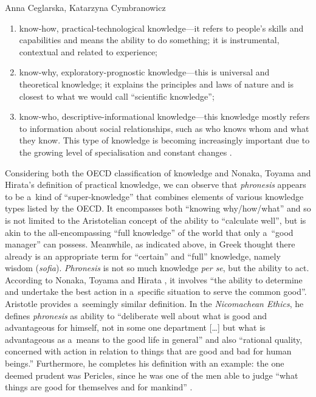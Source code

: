 \begin{artengenv2auth}{Anna Ceglarska, Katarzyna Cymbranowicz}
\begin{enumerate}
\item know-how, practical-technological knowledge---it refers to people's skills and capabilities and means the ability to do something; it is instrumental, contextual and related to experience;

\item know-why, exploratory-prognostic knowledge---this is universal and theoretical knowledge; it explains the principles and laws of nature and is closest to what we would call ``scientific knowledge'';

\item know-who, descriptive-informational knowledge---this knowledge mostly refers to information about social relationships, such as who knows whom and what they know. This type of knowledge is becoming increasingly important due to the growing level of specialisation and constant changes 
\parencites[][p.12]{oecd_knowledge-based_1996}[][p.190]{clarke_knowledge_2001}.%
\end{enumerate}

Considering both the OECD classification of knowledge and Nonaka, Toyama and Hirata's definition of practical knowledge, we can observe that \textit{phronesis} appears to be a~kind of ``super-knowledge'' that combines elements of various knowledge types listed by the OECD. It encompasses both ``knowing why/how/what'' and so is not limited to the Aristotelian concept of the ability to ``calculate well'', but is akin to the all-encompassing ``full knowledge'' of the world that only a~``good manager'' can possess. Meanwhile, as indicated above, in Greek thought there already is an appropriate term for ``certain'' and ``full'' knowledge, namely wisdom (\textit{sofia}). \textit{Phronesis} is not so much knowledge \textit{per se}, but the ability to act. According to Nonaka, Toyama and Hirata 
\parencite*[][p.53]{nonaka_managing_2008}, %
 it involves ``the ability to determine and undertake the best action in a~specific situation to serve the common good''. Aristotle provides a~seemingly similar definition. In the \textit{Nicomachean Ethics}, he defines \textit{phronesis} as ability to ``deliberate well about what is good and advantageous for himself, not in some one department […] but what is advantageous as a~means to the good life in general'' and also ``rational quality, concerned with action in relation to things that are good and bad for human beings.'' Furthermore, he completes his definition with an example: the one deemed prudent was Pericles, since he was one of the men able to judge ``what things are good for themselves and for mankind'' 
\parencite[][]{rackham_nicomachean_1934}.%





\end{artengenv2auth}
